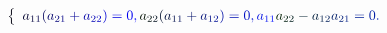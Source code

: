 \documentclass[12pt]{article}
\begin{document}
\makeatletter
\renewcommand*{\@textcolor}[3]{%
  \protect\leavevmode
  \begingroup
    \color#1{#2}#3%
  \endgroup
}
\makeatother
\begin{displaymath}
\mathcolor[RGB]{0,0,15}{\left\{} \begin{array} {l} \mathcolor[RGB]{0,0,30}{\textstyle} { \mathcolor[RGB]{0,0,45}{a} _ { \mathcolor[RGB]{0,0,60}{1} \mathcolor[RGB]{0,0,75}{1} } \mathcolor[RGB]{0,0,90}{(} \mathcolor[RGB]{0,0,105}{a} _ { \mathcolor[RGB]{0,0,120}{2} \mathcolor[RGB]{0,0,135}{1} } \mathcolor[RGB]{0,0,150}{+} \mathcolor[RGB]{0,0,165}{a} _ { \mathcolor[RGB]{0,0,180}{2} \mathcolor[RGB]{0,0,195}{2} } \mathcolor[RGB]{0,0,210}{)} \mathcolor[RGB]{0,0,225}{=} \mathcolor[RGB]{0,0,240}{0} \mathcolor[RGB]{0,0,255}{,} \mathcolor[RGB]{0,15,0}{a} _ { \mathcolor[RGB]{0,15,15}{2} \mathcolor[RGB]{0,15,30}{2} } \mathcolor[RGB]{0,15,45}{(} \mathcolor[RGB]{0,15,60}{a} _ { \mathcolor[RGB]{0,15,75}{1} \mathcolor[RGB]{0,15,90}{1} } \mathcolor[RGB]{0,15,105}{+} \mathcolor[RGB]{0,15,120}{a} _ { \mathcolor[RGB]{0,15,135}{1} \mathcolor[RGB]{0,15,150}{2} } \mathcolor[RGB]{0,15,165}{)} \mathcolor[RGB]{0,15,180}{=} \mathcolor[RGB]{0,15,195}{0} \mathcolor[RGB]{0,15,210}{,} \mathcolor[RGB]{0,15,225}{a} _ { \mathcolor[RGB]{0,15,240}{1} \mathcolor[RGB]{0,15,255}{1} } \mathcolor[RGB]{0,30,0}{a} _ { \mathcolor[RGB]{0,30,15}{2} \mathcolor[RGB]{0,30,30}{2} } \mathcolor[RGB]{0,30,45}{-} \mathcolor[RGB]{0,30,60}{a} _ { \mathcolor[RGB]{0,30,75}{1} \mathcolor[RGB]{0,30,90}{2} } \mathcolor[RGB]{0,30,105}{a} _ { \mathcolor[RGB]{0,30,120}{2} \mathcolor[RGB]{0,30,135}{1} } \mathcolor[RGB]{0,30,150}{=} \mathcolor[RGB]{0,30,165}{0} \mathcolor[RGB]{0,30,180}{.} } \end{array} \mathcolor[RGB]{0,30,195}{\right.}
\end{displaymath}
\end{document}
